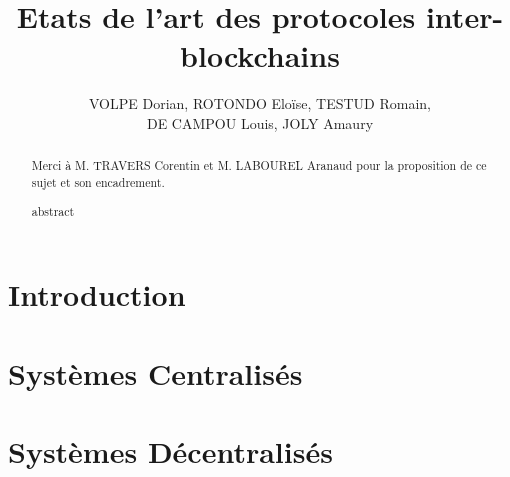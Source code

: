 \documentclass{article}
\newenvironment*{remerciements}{%
  \renewcommand*{\abstractname}{Remerciements}
  \begin{abstract}
}{
  \end{abstract}
}
\begin{document}
\title{Etats de l'art des protocoles inter-blockchains}
\author{VOLPE Dorian, ROTONDO Eloïse, TESTUD Romain,\\DE CAMPOU Louis, JOLY Amaury}


\begin{titlepage}
  \maketitle
  \begin{remerciements}
    Merci à M. TRAVERS Corentin et M. LABOUREL Aranaud pour la proposition de ce sujet et son encadrement.
  \end{remerciements}
  \begin{abstract}
    abstract
  \end{abstract}
\end{titlepage}


\tableofcontents

\part{Introduction}

\part{Systèmes Centralisés}

\part{Systèmes Décentralisés}

\end{document}
